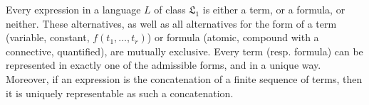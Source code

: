 Every expression in a language $L$ of class $\mathfrak{L}_1$ is either a term, or a formula, or neither. These alternatives, as well as all alternatives for the form of a term (variable, constant, $f(t_1,\ldots,t_r)$) or formula (atomic, compound with a connective, quantified), are mutually exclusive. Every term (resp. formula) can be represented in exactly one of the admissible forms, and in a unique way. Moreover, if an expression is the concatenation of a finite sequence of terms, then it is uniquely representable as such a concatenation.
